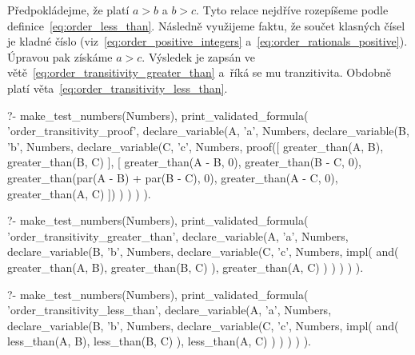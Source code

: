 Předpokládejme, že platí \(a > b\) a \(b > c\). Tyto relace nejdříve rozepíšeme podle definice~\eqref{eq:order_less_than}. Následně využijeme faktu, že součet klasných čísel je kladné číslo (viz~\eqref{eq:order_positive_integers} a~\eqref{eq:order_rationals_positive}). Úpravou pak získáme \(a > c\). Výsledek je zapsán ve větě~\eqref{eq:order_transitivity_greater_than} a~říká se mu tranzitivita. Obdobně platí věta~\eqref{eq:order_transitivity_less_than}.

\begin{prolog}
?-	make_test_numbers(Numbers),
	print_validated_formula(
		'order_transitivity_proof',
		declare_variable(A, 'a', Numbers,
			declare_variable(B, 'b', Numbers,
				declare_variable(C, 'c', Numbers,
					proof([
						greater_than(A, B),
						greater_than(B, C)
					],
					[
						greater_than(A - B, 0),
						greater_than(B - C, 0),
						greater_than(par(A - B) + par(B - C), 0),
						greater_than(A - C, 0),
						greater_than(A, C)
					])
				)
			)
		)
	).
\end{prolog}

\begin{fact}
\begin{prolog}
?-	make_test_numbers(Numbers),
	print_validated_formula(
		'order_transitivity_greater_than',
		declare_variable(A, 'a', Numbers,
			declare_variable(B, 'b', Numbers,
				declare_variable(C, 'c', Numbers,
					impl(
						and(
							greater_than(A, B),
							greater_than(B, C)
						),
						greater_than(A, C)
					)
				)
			)
		)
	).
\end{prolog}
\begin{prolog}
?-	make_test_numbers(Numbers),
	print_validated_formula(
		'order_transitivity_less_than',
		declare_variable(A, 'a', Numbers,
			declare_variable(B, 'b', Numbers,
				declare_variable(C, 'c', Numbers,
					impl(
						and(
							less_than(A, B),
							less_than(B, C)
						),
						less_than(A, C)
					)
				)
			)
		)
	).
\end{prolog}
\end{fact}
